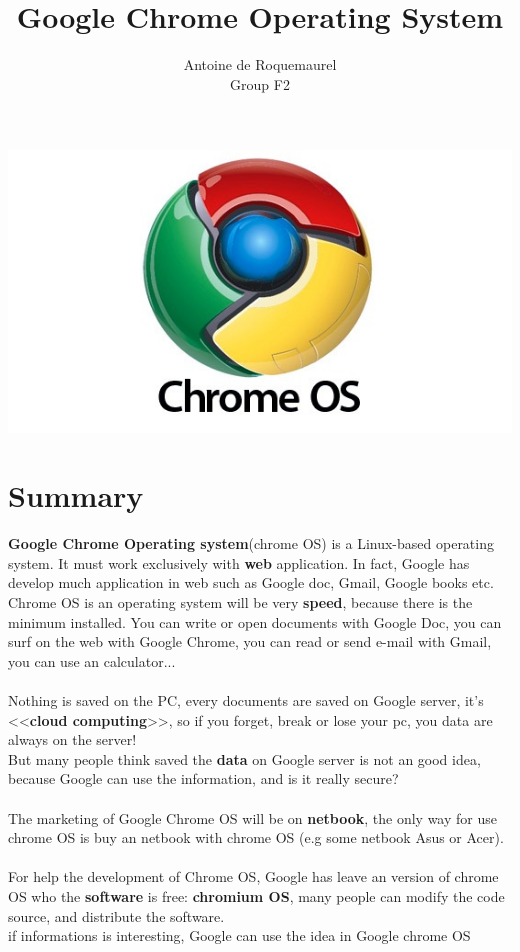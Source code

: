 \documentclass{article}
\title{Google Chrome Operating System}
\date{Antoine de Roquemaurel \\Group F2}
\begin{document}
	\maketitle
	\begin{center}
	\includegraphics[width=15cm]{logo.jpg}
	\end{center}
		\newpage
	\section{Summary}
	\textbf{Google Chrome Operating system}(chrome OS) is a Linux-based operating system. It must work 
	exclusively with \textbf{web} application. In fact, Google has develop much application in web such 
	as Google doc, Gmail, Google books etc.\\ 
	Chrome OS is an operating system will be very \textbf{speed}, because there is the minimum installed. 
	You can write or open documents with Google Doc, you can surf on the web with Google Chrome,
	you can read or send e-mail with Gmail, you can use an calculator... \\ \\
	Nothing is saved on the PC, every documents are saved on Google server, it's <<\textbf{cloud computing}>>, so if
	you forget, break or lose your pc, you data are always on the server!\\
	But many people think saved the \textbf{data} on Google server is not an good idea, because Google can use
	the information, and is it really secure?\\ \\
	The marketing of Google Chrome OS will be on \textbf{netbook}, the only way for use chrome OS is buy an 
	netbook with chrome OS (e.g some netbook Asus or Acer).\\ \\
	For help the development of Chrome OS, Google has leave an version of chrome OS who the \textbf{software} is
	free: \textbf{chromium OS}, many people can modify the code source, and distribute the software. \\
	if informations is interesting, Google can use the idea in Google chrome OS
\end{document}
